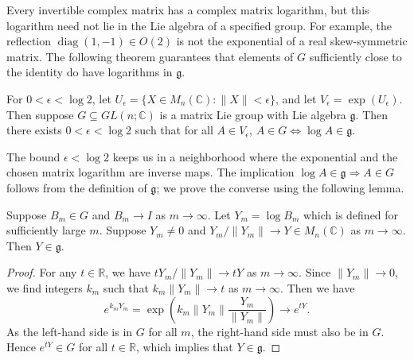\documentclass[../main.tex]{subfiles}
\begin{document}
Every invertible complex matrix has a complex matrix logarithm, but this logarithm need not lie in the Lie algebra of a specified group. For example, the reflection $\operatorname{diag}(1,-1)\in O(2)$ is not the exponential of a real skew-symmetric matrix. The following theorem guarantees that elements of $G$ sufficiently close to the identity do have logarithms in $\mathfrak{g}$.

\begin{theorem}{}{}
  For $0<\epsilon<\log 2$, let $U_\epsilon=\{X\in M_n(\mathbb{C}) : \|X\|<\epsilon\}$, and let $V_\epsilon=\exp(U_\epsilon)$. Then suppose $G \subseteq GL(n;\mathbb{C})$ is a matrix Lie group with Lie algebra $\mathfrak{g}$. Then there exists $0<\epsilon<\log 2$ such that for all $A\in V_\epsilon$, $A \in G \Leftrightarrow \log A \in \mathfrak{g}$.
\end{theorem}

The bound $\epsilon<\log 2$ keeps us in a neighborhood where the exponential and the chosen matrix logarithm are inverse maps. The implication $\log A\in\mathfrak{g}\Rightarrow A\in G$ follows from the definition of $\mathfrak{g}$; we prove the converse using the following lemma.

\begin{lemma}{}{}
  Suppose $B_m \in G$ and $B_m \to I$ as $m \to \infty$. Let $Y_m = \log B_m$ which is defined for sufficiently large $m$. Suppose $Y_m \neq 0$ and $Y_m / \|Y_m\| \to Y \in M_n(\mathbb{C})$ as $m \to \infty$. Then $Y \in \mathfrak{g}$.
\end{lemma}
\begin{proof}
  For any $t \in \mathbb{R}$, we have $t Y_m / \|Y_m\| \to t Y$ as $m \to \infty$. Since $\|Y_m\| \to 0$, we find integers $k_m$ such that $k_m \|Y_m\| \to t$ as $m \to \infty$. Then we have
  \begin{equation}
    e^{k_m Y_m} = \exp\left(k_m \|Y_m\| \frac{Y_m}{\|Y_m\|}\right) \to e^{t Y}.
  \end{equation}
  As the left-hand side is in $G$ for all $m$, the right-hand side must also be in $G$. Hence $e^{t Y} \in G$ for all $t \in \mathbb{R}$, which implies that $Y \in \mathfrak{g}$.
\end{proof}
\end{document}
